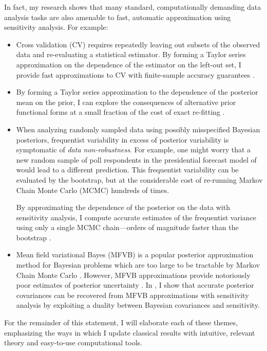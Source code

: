 In fact, my research shows that many standard, computationally demanding data
analysis tasks are also amenable to fast, automatic approximation using
sensitivity analysis. For example:
%
\begin{itemize}
\item Cross validation (CV) requires repeatedly leaving out subsets of the
observed data and re-evaluating a statistical estimator. By forming a Taylor
series approximation on the dependence of the estimator on the left-out set, I
provide fast approximations to CV with finite-sample accuracy guarantees
\citep{giordano:2019:ij}.
%
\item

By
forming a Taylor series approximation to the dependence of the posterior mean on
the prior, I can explore the consequences of alternative prior functional forms
at a small fraction of the cost of exact re-fitting
\citep{giordano:2020:rstansensitivity, giordano:2021:bnpsensitivity}.
%
\item

When analyzing randomly sampled data using possibly misspecified Bayesian
posteriors, frequentist variability in excess of posterior variability is
symptomatic of \emph{data non-robustness}. For example, one might worry that a
new random sample of poll respondents in the presidential forecast model of
\citet{economist:2020:election} would lead to a different prediction.  This
frequentist variability can be evaluated by the bootstrap, but at the
considerable cost of re-running Markov Chain Monte Carlo (MCMC) hundreds of
times.

By approximating the dependence of the posterior on the data with
sensitivity analysis, I compute accurate estimates of the frequentist variance
using only a single MCMC chain---orders of magnitude faster than the bootstrap
\citep{giordano:2020:stanconbayesij}.
%
\item Mean field variational Bayes (MFVB) is a popular posterior approximation
method for Bayesian problems which are too large to be tractable by Markov Chain
Monte Carlo \citep{blei:2017:variational, regier:2019:cataloging}.  However,
MFVB approximations provide notoriously poor estimates of posterior uncertainty
\citep{turner:2011:two}.  In \citet{giordano:2018:covariances}, I show that
accurate posterior covariances can be recovered from MFVB approximations with
sensitivity analysis by exploiting a duality between Bayesian covariances and
sensitivity.
%
\end{itemize}

For the remainder of this statement, I will elaborate each of these themes,
emphasizing the ways in which I update classical results with intuitive,
relevant theory and easy-to-use computational tools.

\newpage
